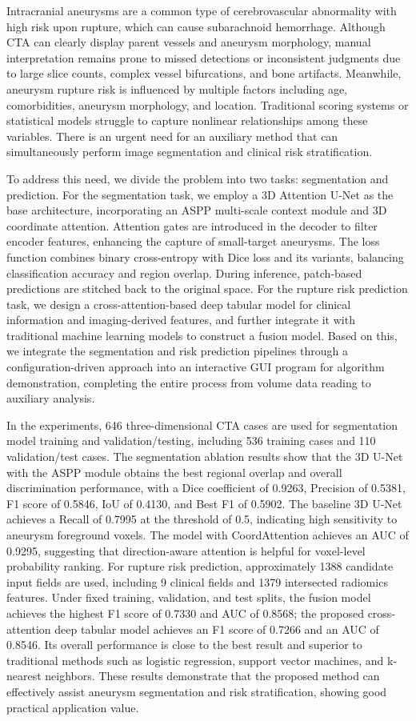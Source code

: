 Intracranial aneurysms are a common type of cerebrovascular abnormality with high risk upon rupture, which can cause subarachnoid hemorrhage. Although CTA can clearly display parent vessels and aneurysm morphology, manual interpretation remains prone to missed detections or inconsistent judgments due to large slice counts, complex vessel bifurcations, and bone artifacts. Meanwhile, aneurysm rupture risk is influenced by multiple factors including age, comorbidities, aneurysm morphology, and location. Traditional scoring systems or statistical models struggle to capture nonlinear relationships among these variables. There is an urgent need for an auxiliary method that can simultaneously perform image segmentation and clinical risk stratification.

To address this need, we divide the problem into two tasks: segmentation and prediction. For the segmentation task, we employ a 3D Attention U-Net as the base architecture, incorporating an ASPP multi-scale context module and 3D coordinate attention. Attention gates are introduced in the decoder to filter encoder features, enhancing the capture of small-target aneurysms. The loss function combines binary cross-entropy with Dice loss and its variants, balancing classification accuracy and region overlap. During inference, patch-based predictions are stitched back to the original space. For the rupture risk prediction task, we design a cross-attention-based deep tabular model for clinical information and imaging-derived features, and further integrate it with traditional machine learning models to construct a fusion model. Based on this, we integrate the segmentation and risk prediction pipelines through a configuration-driven approach into an interactive GUI program for algorithm demonstration, completing the entire process from volume data reading to auxiliary analysis.

In the experiments, 646 three-dimensional CTA cases are used for segmentation model training and validation/testing, including 536 training cases and 110 validation/test cases. The segmentation ablation results show that the 3D U-Net with the ASPP module obtains the best regional overlap and overall discrimination performance, with a Dice coefficient of 0.9263, Precision of 0.5381, F1 score of 0.5846, IoU of 0.4130, and Best F1 of 0.5902. The baseline 3D U-Net achieves a Recall of 0.7995 at the threshold of 0.5, indicating high sensitivity to aneurysm foreground voxels. The model with CoordAttention achieves an AUC of 0.9295, suggesting that direction-aware attention is helpful for voxel-level probability ranking. For rupture risk prediction, approximately 1388 candidate input fields are used, including 9 clinical fields and 1379 intersected radiomics features. Under fixed training, validation, and test splits, the fusion model achieves the highest F1 score of 0.7330 and AUC of 0.8568; the proposed cross-attention deep tabular model achieves an F1 score of 0.7266 and an AUC of 0.8546. Its overall performance is close to the best result and superior to traditional methods such as logistic regression, support vector machines, and k-nearest neighbors. These results demonstrate that the proposed method can effectively assist aneurysm segmentation and risk stratification, showing good practical application value.
